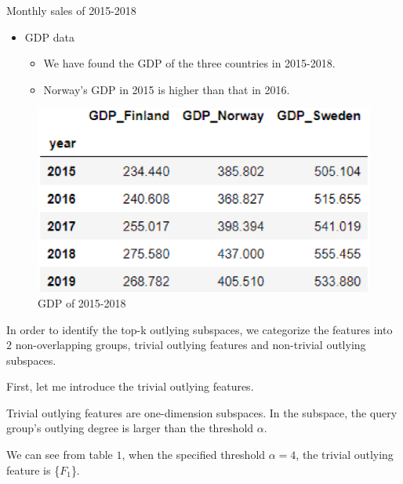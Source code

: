 \documentclass[
 size=14pt,
 paper=smartboard,  %
 mode=present, 		%
 display=slides, 	%
 style=tuliplab,  	%
 pauseslide,
 fleqn,leqno]{powerdot}
\begin{document}
\begin{slide}[toc=,bm=]{Monthly sales of 2015-2018}
\begin{itemize}
\item
GDP data

\begin{itemize}
\item
\smallskip
We have found the GDP of the three countries in 2015-2018.

\item
\smallskip
Norway's GDP in 2015 is higher than that in 2016.
\end{itemize}
\end{itemize}
\begin{figure}     
\centering     
\includegraphics[totalheight=2.8in]{10.eps}     
\caption{GDP of 2015-2018}     
\end{figure}

\begin{note}
In order to identify the top-k outlying subspaces,
we categorize the features into $2$ non-overlapping groups,
trivial outlying features and non-trivial outlying subspaces.

First, let me introduce the trivial outlying features.

Trivial outlying features are one-dimension subspaces.
In the subspace,
the query group's outlying degree is larger than the threshold $\alpha$.

We can see from table $1$,
when the specified threshold $\alpha = 4$,
the trivial outlying feature is \{$F_1$\}.
\end{note}

\end{slide}
\end{document}
